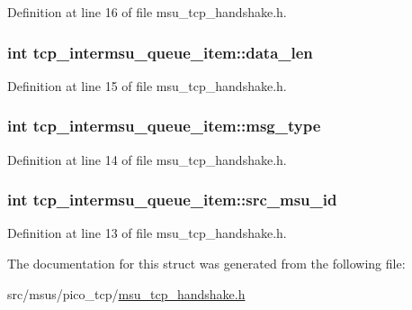 Definition at line 16 of file msu\-\_\-tcp\-\_\-handshake.\-h.

\hypertarget{structtcp__intermsu__queue__item_a7c72efb4c359f8be69b154a58b0c6024}{
\subsubsection[{data\-\_\-len}]{\setlength{\rightskip}{0pt plus 5cm}int tcp\-\_\-intermsu\-\_\-queue\-\_\-item\-::data\-\_\-len}}\label{structtcp__intermsu__queue__item_a7c72efb4c359f8be69b154a58b0c6024}


Definition at line 15 of file msu\-\_\-tcp\-\_\-handshake.\-h.

\hypertarget{structtcp__intermsu__queue__item_a7a009ad7a7ac74685a3ce5f68cebb875}{
\subsubsection[{msg\-\_\-type}]{\setlength{\rightskip}{0pt plus 5cm}int tcp\-\_\-intermsu\-\_\-queue\-\_\-item\-::msg\-\_\-type}}\label{structtcp__intermsu__queue__item_a7a009ad7a7ac74685a3ce5f68cebb875}


Definition at line 14 of file msu\-\_\-tcp\-\_\-handshake.\-h.

\hypertarget{structtcp__intermsu__queue__item_a6e4f60b7b4ccfa293441bcd271bd0ae2}{
\subsubsection[{src\-\_\-msu\-\_\-id}]{\setlength{\rightskip}{0pt plus 5cm}int tcp\-\_\-intermsu\-\_\-queue\-\_\-item\-::src\-\_\-msu\-\_\-id}}\label{structtcp__intermsu__queue__item_a6e4f60b7b4ccfa293441bcd271bd0ae2}


Definition at line 13 of file msu\-\_\-tcp\-\_\-handshake.\-h.



The documentation for this struct was generated from the following file\-:\begin{DoxyCompactItemize}
\item 
src/msus/pico\-\_\-tcp/\hyperlink{msu__tcp__handshake_8h}{msu\-\_\-tcp\-\_\-handshake.\-h}\end{DoxyCompactItemize}
